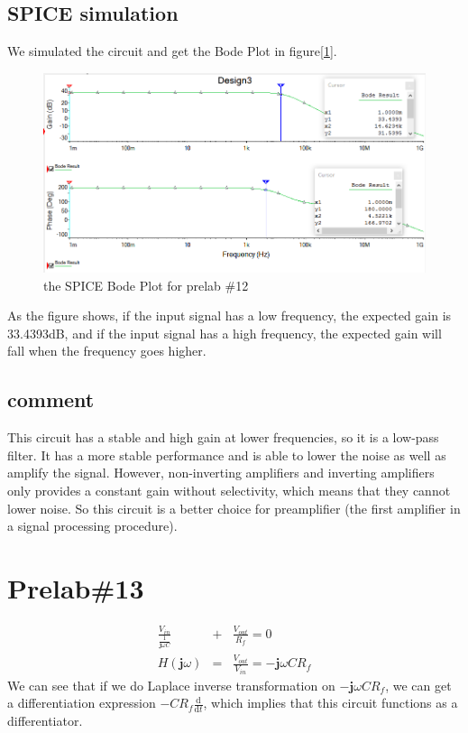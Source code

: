 \documentclass{IEEEtran}
\begin{document}
	\subsection{SPICE simulation}
	We simulated the circuit and get the Bode Plot in figure[\ref{fig:1201}].\\
	\begin{figure}[!htbp]
		\centering
		\begin{framed}
			\includegraphics[width=\linewidth]{images/12_1.PNG}
			\caption{the SPICE Bode Plot for prelab \#12}
			\label{fig:1201}
		\end{framed}
	\end{figure}
	\phantom{ } As the figure shows, if the input signal has a low frequency, the expected gain is 33.4393dB, and if the input signal has a high frequency, the expected gain will fall when the frequency goes higher.
	\subsection{comment}
	\phantom{ } This circuit has a stable and high gain at lower frequencies, so it is a low-pass filter. It has a more stable performance and is able to lower the noise as well as amplify the signal. However, non-inverting amplifiers and inverting amplifiers only provides a constant gain without selectivity, which means that they cannot lower noise. So this circuit is a better choice for preamplifier (the first amplifier in a signal processing procedure).
	\section{\textbf{Prelab\#13}}
	\begin{eqnarray*}
		\frac{V_{in}}{\frac{1}{\mathbf{j}\omega C}} & + & \frac{V_{out}}{R_f}  =  0\\
		H(\mathbf{j}\omega) & = & \frac{V_{out}}{V_{in}}  =  -\mathbf{j}\omega CR_f
	\end{eqnarray*}
	\phantom{ } We can see that if we do Laplace inverse transformation on $ -\mathbf{j}\omega CR_f $, we can get a differentiation expression $ -CR_f\frac{\mathrm{d}}{\mathrm{d}t} $, which implies that this circuit functions as a differentiator.
\end{document}
